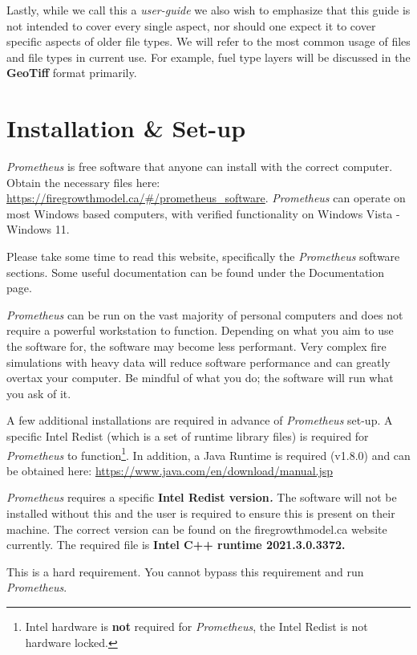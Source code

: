 \documentclass[
  letterpaper,
  DIV=11,
  numbers=noendperiod]{scrreprt}
\begin{document}
Lastly, while we call this a \emph{user-guide} we also wish to emphasize
that this guide is not intended to cover every single aspect, nor should
one expect it to cover specific aspects of older file types. We will
refer to the most common usage of files and file types in current use.
For example, fuel type layers will be discussed in the \textbf{GeoTiff}
format primarily.


\chapter{Installation \& Set-up}\label{installation-set-up}

\emph{Prometheus} is free software that anyone can install with the
correct computer. Obtain the necessary files here:
\url{https://firegrowthmodel.ca/\#/prometheus_software}.
\emph{Prometheus} can operate on most Windows based computers, with
verified functionality on Windows Vista - Windows 11.

Please take some time to read this website, specifically the
\emph{Prometheus} software sections. Some useful documentation can be
found under the Documentation page.

\emph{Prometheus} can be run on the vast majority of personal computers
and does not require a powerful workstation to function. Depending on
what you aim to use the software for, the software may become less
performant. Very complex fire simulations with heavy data will reduce
software performance and can greatly overtax your computer. Be mindful
of what you do; the software will run what you ask of it.

A few additional installations are required in advance of
\emph{Prometheus} set-up. A specific Intel Redist (which is a set of
runtime library files) is required for \emph{Prometheus} to
function\footnote{Intel hardware is \textbf{not} required for
  \emph{Prometheus}, the Intel Redist is not hardware locked.}. In
addition, a Java Runtime is required (v1.8.0) and can be obtained here:
\url{https://www.java.com/en/download/manual.jsp}

\emph{Prometheus} requires a specific \textbf{Intel Redist
version\emph{.}} The software will not be installed without this and the
user is required to ensure this is present on their machine. The correct
version can be found on the firegrowthmodel.ca website currently. The
required file is \textbf{Intel C++ runtime 2021.3.0.3372.}

This is a hard requirement. You cannot bypass this requirement and run
\emph{Prometheus}.
\end{document}
